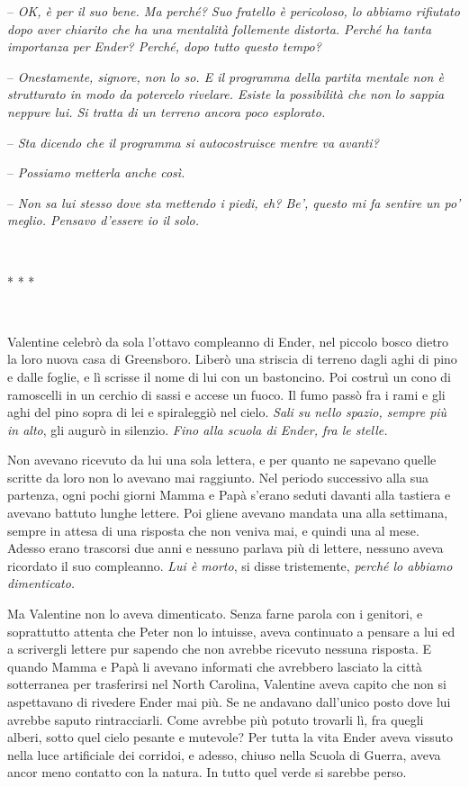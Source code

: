 {-- \emph{OK, è per il suo bene. Ma perché? Suo fratello è pericoloso,
		lo abbiamo rifiutato dopo aver chiarito che ha una mentalità follemente
		distorta. Perché ha tanta importanza per Ender? Perché, dopo tutto
		questo tempo?}}

{-- \emph{Onestamente, signore, non lo so. E il programma della partita
		mentale non è strutturato in modo da potercelo rivelare. Esiste la
		possibilità che non lo sappia neppure lui. Si tratta di un terreno
		ancora poco esplorato.}}

{-- \emph{Sta dicendo che il programma si autocostruisce mentre va
		avanti?}}

{-- \emph{Possiamo metterla anche così.}}

{-- \emph{Non sa lui stesso dove sta mettendo i piedi, eh? Be', questo
		mi fa sentire un po' meglio. Pensavo d'essere io il solo.}}

{~}

\begin{center}
	{* * *}
\end{center}

{~}

{Valentine celebrò da sola l'ottavo compleanno di Ender, nel piccolo
	bosco dietro la loro nuova casa di Greensboro. Liberò una striscia di
	terreno dagli aghi di pino e dalle foglie, e lì scrisse il nome di lui
	con un bastoncino. Poi costruì un cono di ramoscelli in un cerchio di
	sassi e accese un fuoco. Il fumo passò fra i rami e gli aghi del pino
	sopra di lei e spiraleggiò nel cielo. \emph{Sali su nello spazio, sempre
		più in alto}, \emph{} gli augurò in silenzio. \emph{Fino alla scuola di
		Ender, fra le stelle.}}

{Non avevano ricevuto da lui una sola lettera, e per quanto ne sapevano
	quelle scritte da loro non lo avevano mai raggiunto. Nel periodo
	successivo alla sua partenza, ogni pochi giorni Mamma e Papà s'erano
	seduti davanti alla tastiera e avevano battuto lunghe lettere. Poi
	gliene avevano mandata una alla settimana, sempre in attesa di una
	risposta che non veniva mai, e quindi una al mese. Adesso erano
	trascorsi due anni e nessuno parlava più di lettere, nessuno aveva
	ricordato il suo compleanno. \emph{Lui è morto}, \emph{} si disse
	tristemente, \emph{perché lo abbiamo dimenticato.}}

{Ma Valentine non lo aveva dimenticato. Senza farne parola con i
	genitori, e soprattutto attenta che Peter non lo intuisse, aveva
	continuato a pensare a lui ed a scrivergli lettere pur sapendo che non
	avrebbe ricevuto nessuna risposta. E quando Mamma e Papà li avevano
	informati che avrebbero lasciato la città sotterranea per trasferirsi
	nel North Carolina, Valentine aveva capito che non si aspettavano di
	rivedere Ender mai più. Se ne andavano dall'unico posto dove lui avrebbe
	saputo rintracciarli. Come avrebbe più potuto trovarli lì, fra quegli
	alberi, sotto quel cielo pesante e mutevole? Per tutta la vita Ender
	aveva vissuto nella luce artificiale dei corridoi, e adesso, chiuso
	nella Scuola di Guerra, aveva ancor meno contatto con la natura. In
	tutto quel verde si sarebbe perso.}

